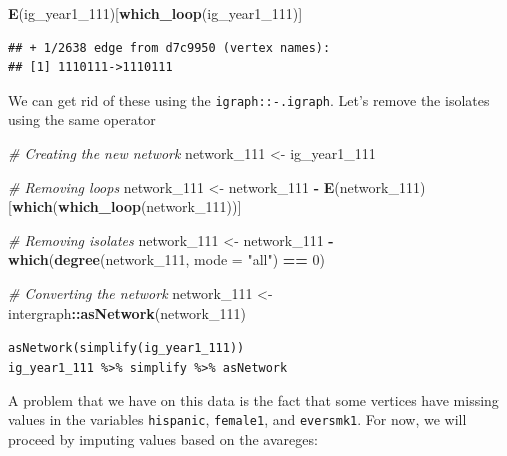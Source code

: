 \documentclass[]{book}
\newenvironment{Shaded}{\begin{snugshade}}{\end{snugshade}}
\newcommand{\CommentTok}[1]{\textcolor[rgb]{0.56,0.35,0.01}{\textit{#1}}}
\newcommand{\DataTypeTok}[1]{\textcolor[rgb]{0.13,0.29,0.53}{#1}}
\newcommand{\DecValTok}[1]{\textcolor[rgb]{0.00,0.00,0.81}{#1}}
\newcommand{\KeywordTok}[1]{\textcolor[rgb]{0.13,0.29,0.53}{\textbf{#1}}}
\newcommand{\NormalTok}[1]{#1}
\newcommand{\OperatorTok}[1]{\textcolor[rgb]{0.81,0.36,0.00}{\textbf{#1}}}
\newcommand{\StringTok}[1]{\textcolor[rgb]{0.31,0.60,0.02}{#1}}
\begin{document}
\begin{Shaded}
\begin{Highlighting}[]
\KeywordTok{E}\NormalTok{(ig_year1_}\DecValTok{111}\NormalTok{)[}\KeywordTok{which_loop}\NormalTok{(ig_year1_}\DecValTok{111}\NormalTok{)]}
\end{Highlighting}
\end{Shaded}

\begin{verbatim}
## + 1/2638 edge from d7c9950 (vertex names):
## [1] 1110111->1110111
\end{verbatim}

We can get rid of these using the \texttt{igraph::-.igraph}. Let's remove the isolates using the same operator

\begin{Shaded}
\begin{Highlighting}[]
\CommentTok{# Creating the new network}
\NormalTok{network_}\DecValTok{111}\NormalTok{ <-}\StringTok{ }\NormalTok{ig_year1_}\DecValTok{111}

\CommentTok{# Removing loops}
\NormalTok{network_}\DecValTok{111}\NormalTok{ <-}\StringTok{ }\NormalTok{network_}\DecValTok{111} \OperatorTok{-}\StringTok{ }\KeywordTok{E}\NormalTok{(network_}\DecValTok{111}\NormalTok{)[}\KeywordTok{which}\NormalTok{(}\KeywordTok{which_loop}\NormalTok{(network_}\DecValTok{111}\NormalTok{))]}

\CommentTok{# Removing isolates}
\NormalTok{network_}\DecValTok{111}\NormalTok{ <-}\StringTok{ }\NormalTok{network_}\DecValTok{111} \OperatorTok{-}\StringTok{ }\KeywordTok{which}\NormalTok{(}\KeywordTok{degree}\NormalTok{(network_}\DecValTok{111}\NormalTok{, }\DataTypeTok{mode =} \StringTok{"all"}\NormalTok{) }\OperatorTok{==}\StringTok{ }\DecValTok{0}\NormalTok{)}

\CommentTok{# Converting the network}
\NormalTok{network_}\DecValTok{111}\NormalTok{ <-}\StringTok{ }\NormalTok{intergraph}\OperatorTok{::}\KeywordTok{asNetwork}\NormalTok{(network_}\DecValTok{111}\NormalTok{)}
\end{Highlighting}
\end{Shaded}

\texttt{asNetwork(simplify(ig\_year1\_111))}
\texttt{ig\_year1\_111\ \%\textgreater{}\%\ simplify\ \%\textgreater{}\%\ asNetwork}

A problem that we have on this data is the fact that some vertices have
missing values in the variables \texttt{hispanic}, \texttt{female1}, and \texttt{eversmk1}. For now,
we will proceed by imputing values based on the avareges:
\end{document}
